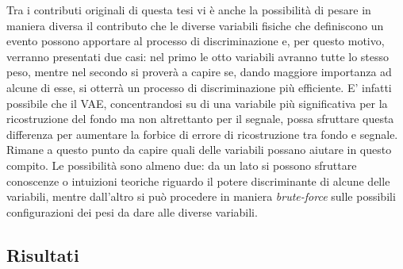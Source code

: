 Tra i contributi originali di questa tesi vi è anche la possibilità di pesare in maniera diversa il contributo che le diverse variabili fisiche che definiscono un evento possono apportare al processo di discriminazione e, per questo motivo, verranno presentati due casi: nel primo le otto variabili avranno tutte lo stesso peso, mentre nel secondo si proverà a capire se, dando maggiore importanza ad alcune di esse, si otterrà un processo di discriminazione più efficiente. E' infatti possibile che il VAE, concentrandosi su di una variabile più significativa per la ricostruzione del fondo ma non altrettanto per il segnale, possa sfruttare questa differenza per aumentare la forbice di errore di ricostruzione tra fondo e segnale. Rimane a questo punto da capire quali delle variabili possano aiutare in questo compito. Le possibilità sono almeno due: da un lato si possono sfruttare conoscenze o intuizioni teoriche riguardo il potere discriminante di alcune delle variabili, mentre dall'altro si può procedere in maniera \textit{brute-force} sulle possibili configurazioni dei pesi da dare alle diverse variabili.\\


\newpage


\subsection{Risultati}
\label{risultati}


